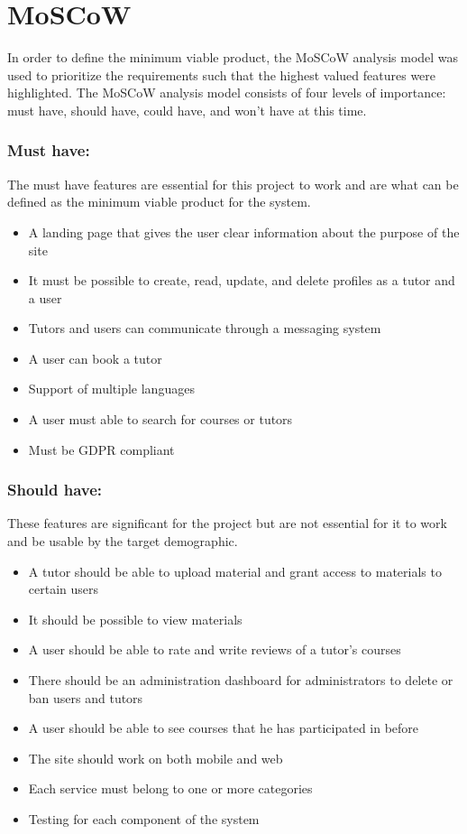 \section{MoSCoW}
In order to define the minimum viable product, the MoSCoW analysis model was used to prioritize the requirements such that the highest valued features were highlighted.
The MoSCoW analysis model consists of four levels of importance: must have, should have, could have, and won't have at this time.

\subsubsection{Must have:}
The must have features are essential for this project to work and are what can be defined as the minimum viable product for the system.

\begin{itemize}
    \item A landing page that gives the user clear information about the purpose of the site
    \item It must be possible to create, read, update, and delete profiles as a tutor and a user
    \item Tutors and users can communicate through a messaging system
    \item A user can book a tutor
    \item Support of multiple languages
    \item A user must able to search for courses or tutors
    \item Must be GDPR compliant
\end{itemize}

\subsubsection{Should have:}
These features are significant for the project but are not essential for it to work and be usable by the target demographic.

\begin{itemize}
    \item A tutor should be able to upload material and grant access to materials to certain users
    \item It should be possible to view materials
    \item A user should be able to rate and write reviews of a tutor's courses
    \item There should be an administration dashboard for administrators to delete or ban users and tutors
    \item A user should be able to see courses that he has participated in before
    \item The site should work on both mobile and web
    \item Each service must belong to one or more categories
    \item Testing for each component of the system
\end{itemize}

